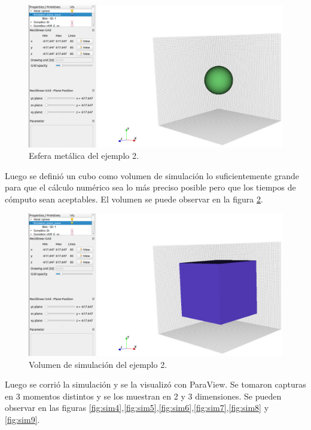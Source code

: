 \documentclass[
    11pt,
    spanish,
    a4paper
]{article}
\begin{document}
\begin{figure}[htbp]
	\centering
	\includegraphics[width=\textwidth]{./img/ejemplo_esfera.png}
	\caption{Esfera metálica del ejemplo 2.}
	\label{fig:sim2}
\end{figure}

Luego se definió un cubo como volumen de simulación lo suficientemente grande
para que el cálculo numérico sea lo más preciso posible pero que los tiempos de
cómputo sean aceptables. El volumen se puede observar en la figura \ref{fig:sim3}.

\begin{figure}[htbp]
	\centering
	\includegraphics[width=\textwidth]{./img/ejemplo_cubo.png}
	\caption{Volumen de simulación del ejemplo 2.}
	\label{fig:sim3}
\end{figure}

Luego se corrió la simulación y se la visualizó con ParaView.
Se tomaron capturas en 3 momentos distintos y se los muestran en 2 y 3
dimensiones.
Se pueden observar en las figuras \ref{fig:sim4},\ref{fig:sim5},\ref{fig:sim6},\ref{fig:sim7},\ref{fig:sim8} y \ref{fig:sim9}.
\end{document}
